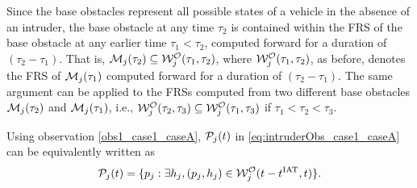 \begin{itemize}[leftmargin=*]
\begin{observation} \label{obs1_case1_caseA}
Since the base obstacles represent all possible states of a vehicle in the absence of an intruder, the base obstacle at any time $\tau_2$ is contained within the FRS of the base obstacle at any earlier time $\tau_1 < \tau_2$, computed forward for a duration of $(\tau_2-\tau_1).$ That is, $\mathcal{M}_j(\tau_2) \subseteq \mathcal{W}_{j}^{\mathcal{O}}(\tau_1, \tau_2)$, where $\mathcal{W}_{j}^{\mathcal{O}}(\tau_1, \tau_2)$, as before, denotes the FRS of $\mathcal{M}_j(\tau_1)$ computed forward for a duration of $(\tau_2-\tau_1)$. The same argument can be applied to the FRSs computed from two different base obstacles $\mathcal{M}_j(\tau_2)$ and $\mathcal{M}_j(\tau_1)$, i.e., $\mathcal{W}_{j}^{\mathcal{O}}(\tau_2, \tau_3) \subseteq \mathcal{W}_{j}^{\mathcal{O}}(\tau_1, \tau_3)$ if $\tau_1 < \tau_2 < \tau_3$.
\end{observation}

Using observation \ref{obs1_case1_caseA}, $\mathcal{P}_j(t)$ in \eqref{eq:intruderObs_case1_caseA} can be equivalently written as
\begin{equation} \label{eq:intruderObs_case1_caseA_inter}
\pfrs_j(t) = \{p_j: \exists \npos_j, (p_j, \npos_j) \in \frs_{j}^{\mathcal{O}}(t-\iat, t) \}.
\end{equation}


\end{itemize}
